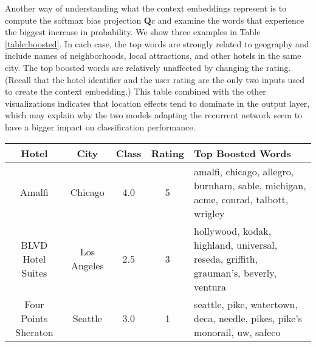 Another way of understanding what the context embeddings represent is to compute the softmax bias projection $\mathbf{Q}c$ and examine the words that experience the biggest increase in probability. We show three examples in Table \ref{table:boosted}. In each case, the top words are strongly related to geography and include names of neighborhoods, local attractions, and other hotels in the same city. The top boosted words are relatively unaffected by changing the rating. (Recall that the hotel identifier and the user rating are the only two inputs used to create the context embedding.) This table combined with the other visualizations indicates that location effects tend to dominate in the output layer, which may explain why the two models adapting the recurrent network seem to have a bigger impact on classification performance.

\begin{table*}[]
\begin{tabular}{ccccp{7.5cm}}
\textbf{Hotel}       & \textbf{City} & \textbf{Class} & \textbf{Rating} & \textbf{Top Boosted Words}    \\ \hline
Amalfi               & Chicago       & 4.0            & 5               & amalfi, chicago, allegro, burnham, sable, michigan, acme, conrad, talbott, wrigley   \\
BLVD Hotel Suites    & Los Angeles   & 2.5            & 3               & hollywood, kodak, highland, universal, reseda, griffith, grauman's, beverly, ventura \\
Four Points Sheraton & Seattle       & 3.0            & 1               & seattle, pike, watertown, deca, needle, pikes, pike's monorail, uw, safeco          
\end{tabular}
\centering
\caption{The top boosted words in the Softmax bias layer for different context settings in a FactorCell model.}
\label{table:boosted}
\end{table*}

